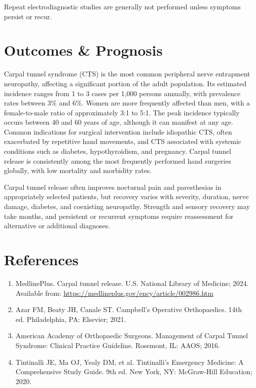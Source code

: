 Repeat electrodiagnostic studies are generally not performed unless symptoms persist or recur.

\section*{Outcomes \& Prognosis}
Carpal tunnel syndrome (CTS) is the most common peripheral nerve entrapment neuropathy, affecting a significant portion of the adult population. Its estimated incidence ranges from 1 to 3 cases per 1,000 persons annually, with prevalence rates between 3\% and 6\%. Women are more frequently affected than men, with a female-to-male ratio of approximately 3:1 to 5:1. The peak incidence typically occurs between 40 and 60 years of age, although it can manifest at any age. Common indications for surgical intervention include idiopathic CTS, often exacerbated by repetitive hand movements, and CTS associated with systemic conditions such as diabetes, hypothyroidism, and pregnancy. Carpal tunnel release is consistently among the most frequently performed hand surgeries globally, with low mortality and morbidity rates.

Carpal tunnel release often improves nocturnal pain and paresthesias in appropriately selected patients, but recovery varies with severity, duration, nerve damage, diabetes, and coexisting neuropathy. Strength and sensory recovery may take months, and persistent or recurrent symptoms require reassessment for alternative or additional diagnoses.

\section*{References}
\begin{enumerate}
  \item MedlinePlus. Carpal tunnel release. U.S. National Library of Medicine; 2024. Available from: \url{https://medlineplus.gov/ency/article/002986.htm}
  
  \item Azar FM, Beaty JH, Canale ST. Campbell's Operative Orthopaedics. 14th ed. Philadelphia, PA: Elsevier; 2021.
  
  \item American Academy of Orthopaedic Surgeons. Management of Carpal Tunnel Syndrome: Clinical Practice Guideline. Rosemont, IL: AAOS; 2016.
  
  \item Tintinalli JE, Ma OJ, Yealy DM, et al. Tintinalli's Emergency Medicine: A Comprehensive Study Guide. 9th ed. New York, NY: McGraw-Hill Education; 2020.
\end{enumerate}

\clearpage
